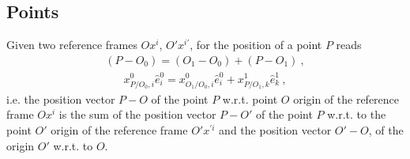 \documentclass[letterpaper,10pt,english]{jupyterBook}
\begin{document}
\subsection{Points}
\label{\detokenize{ch/kinematics-relative:points}}\label{\detokenize{ch/kinematics-relative:classical-mechanics-kinematics-relative-points}}
\sphinxAtStartPar
{}
Given two reference frames \(Ox^i\), \(O' x^{i'}\), for the position of a point \(P\) reads
\begin{equation}\label{equation:ch/kinematics-relative:eq:relative:point:pos}
\begin{split}(P - O_0) = ( O_1 - O_0 ) + ( P - O_1) \ ,\end{split}
\end{equation}\begin{equation*}
\begin{split}x^0_{P/O_0,i} \hat{e}^0_i = x^0_{O_1/O_0,i} \hat{e}^0_i + x^1_{P/O_1,k} \hat{e}^1_k \ ,\end{split}
\end{equation*}
\sphinxAtStartPar
i.e. the position vector \(P-O\) of the point \(P\) w.r.t. point \(O\) \sphinxhyphen{} origin of the reference frame \(O x^i\) \sphinxhyphen{} is the sum of the position vector \(P-O'\) of the point \(P\) w.r.t. to the point \(O'\) \sphinxhyphen{} origin of the reference frame \(O' x^{'i}\) \sphinxhyphen{}  and the position vector \(O' - O\), of the origin \(O'\) w.r.t. to \(O\).
\end{document}
